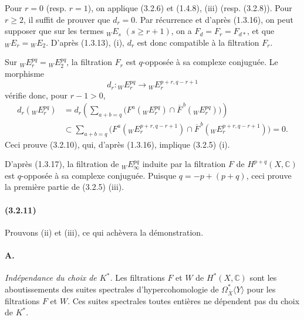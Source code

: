 \documentclass[10pt]{article}
\newcommand{\C}{\mathbb C}
\begin{document}
Pour $r=0$ (resp. $r=1$), on applique (3.2.6) et (1.4.8), (iii) (resp. (3.2.8)). Pour $r\ge2$, il suffit de prouver que $d_r=0$. Par récurrence et d'après (1.3.16), on peut supposer que sur les termes ${}_WE_s$ $(s\ge r+1)$, on a $F_d=F_r=F_{d*}$, et que ${}_WE_r={}_WE_2$. D'après (1.3.13), (i), $d_r$ est donc compatible à la filtration $F_r$.

Sur ${}_WE_r^{pq}={}_WE_2^{pq}$, la filtration $F_r$ est $q$-opposée à sa complexe conjuguée. Le morphisme
\[
d_r:{}_W E_r^{pq}\longrightarrow {}_W E_r^{p+r,q-r+1}
\]
vérifie donc, pour $r-1>0$,
\[
\begin{aligned}
d_r({}_W E_r^{pq})
&=d_r\!\left(\sum_{a+b=q}\bigl(F^a({}_W E_r^{pq})\cap
\overline F^{\,b}({}_W E_r^{pq})\bigr)\right)\\
&\subset
\sum_{a+b=q}\bigl(F^a({}_WE_r^{p+r,q-r+1})\cap
\overline F^{\,b}({}_WE_r^{p+r,q-r+1})\bigr)=0.
\end{aligned}
\]
Ceci prouve (3.2.10), qui, d'après (1.3.16), implique (3.2.5) (i).

D'après (1.3.17), la filtration de ${}_WE_\infty^{pq}$ induite par la filtration $F$ de $H^{p+q}(X,\C)$ est $q$-opposée à sa complexe conjuguée. Puisque $q=-p+(p+q)$, ceci prouve la première partie de (3.2.5) (iii).

\paragraph{(3.2.11)} Prouvons (ii) et (iii), ce qui achèvera la démonstration.

\paragraph{A.} \textit{Indépendance du choix de $K^{*}$.} Les filtrations $F$ et $W$ de $H^*(X,\C)$ sont les aboutissements des suites spectrales d'hypercohomologie de $\Omega_{\overline X}^{*}\langle Y\rangle$ pour les filtrations $F$ et $W$. Ces suites spectrales toutes entières ne dépendent pas du choix de $K^{*}$.
\end{document}

